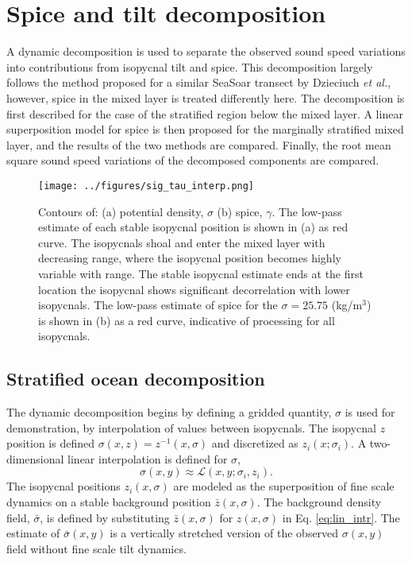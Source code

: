 \documentclass[preprint,NumberedRefs]{JASA}
\begin{document}
\section{\label{sec:decomposition}Spice and tilt decomposition}
A dynamic decomposition is used to separate the observed sound speed variations into contributions from isopycnal tilt and spice. This decomposition largely follows the method proposed for a similar SeaSoar transect by Dzieciuch \emph{et al.}\citep{dzieciuch2004}, however, spice in the mixed layer is treated differently here. The decomposition is first described for the case of the stratified region below the mixed layer. A linear superposition model for spice is then proposed for the marginally stratified mixed layer, and the results of the two methods are compared. Finally, the root mean square sound speed variations of the decomposed components are compared.

\begin{figure}
\texttt{[image: ../figures/sig\_tau\_interp.png]}
    \caption{\label{fig:cntrs}{Contours of: (a) potential density, $\sigma$ (b) spice, $\gamma$. The low-pass estimate of each stable isopycnal position is shown in (a) as red curve. The isopycnals shoal and enter the mixed layer with decreasing range, where the isopycnal position becomes highly variable with range. The stable isopycnal estimate ends at the first location the isopycnal shows significant decorrelation with lower isopycnals. The low-pass estimate of spice for the $\sigma=25.75$ (kg/m$^3$) is shown in (b) as a red curve, indicative of processing for all isopycnals.}}
\end{figure}

\subsection{Stratified ocean decomposition}


The dynamic decomposition begins by defining a gridded quantity, $\sigma$ is used for demonstration, by interpolation of values between isopycnals. The isopycnal $z$ position is defined $\sigma(x, z) = z^{-1}(x, \sigma)$ and discretized as $z_i(x; \sigma_i)$. A two-dimensional linear interpolation is defined for $\sigma$,
\begin{equation}
    \sigma(x,y)\approx\mathcal{L}(x, y; \sigma_i, z_i).
    \label{eq:lin_intr}
\end{equation}
The isopycnal positions $z_i(x, \sigma)$ are modeled as the superposition of fine scale dynamics on a stable background position $\bar{z}(x, \sigma)$. The background density field, $\bar{\sigma}$, is defined by substituting $\bar{z}(x, \sigma)$ for $z(x, \sigma)$ in Eq. \eqref{eq:lin_intr}. The estimate of $\bar{\sigma}(x,y)$ is a vertically stretched version of the observed $\sigma(x,y)$ field without fine scale tilt dynamics.
\end{document}
